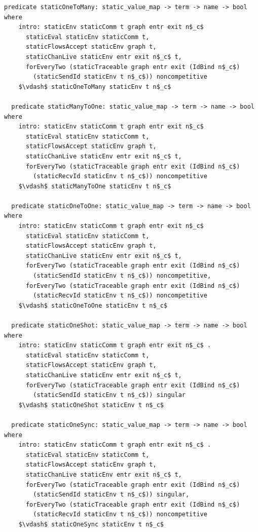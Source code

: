\documentclass[letterpaper, 11pt]{extarticle}
\begin{document}
\begin{lstlisting}[language=logic, mathescape]
  predicate staticOneToMany: static_value_map -> term -> name -> bool where
    intro: staticEnv staticComm t graph entr exit n$_c$ 
      staticEval staticEnv staticComm t,
      staticFlowsAccept staticEnv graph t,
      staticChanLive staticEnv entr exit n$_c$ t, 
      forEveryTwo (staticTraceable graph entr exit (IdBind n$_c$)
        (staticSendId staticEnv t n$_c$)) noncompetitive
    $\vdash$ staticOneToMany staticEnv t n$_c$

  predicate staticManyToOne: static_value_map -> term -> name -> bool where
    intro: staticEnv staticComm t graph entr exit n$_c$ 
      staticEval staticEnv staticComm t,
      staticFlowsAccept staticEnv graph t,
      staticChanLive staticEnv entr exit n$_c$ t, 
      forEveryTwo (staticTraceable graph entr exit (IdBind n$_c$)
        (staticRecvId staticEnv t n$_c$)) noncompetitive
    $\vdash$ staticManyToOne staticEnv t n$_c$

  predicate staticOneToOne: static_value_map -> term -> name -> bool where
    intro: staticEnv staticComm t graph entr exit n$_c$ 
      staticEval staticEnv staticComm t,
      staticFlowsAccept staticEnv graph t,
      staticChanLive staticEnv entr exit n$_c$ t, 
      forEveryTwo (staticTraceable graph entr exit (IdBind n$_c$) 
        (staticSendId staticEnv t n$_c$)) noncompetitive, 
      forEveryTwo (staticTraceable graph entr exit (IdBind n$_c$)
        (staticRecvId staticEnv t n$_c$)) noncompetitive
    $\vdash$ staticOneToOne staticEnv t n$_c$

  predicate staticOneShot: static_value_map -> term -> name -> bool where
    intro: staticEnv staticComm t graph entr exit n$_c$ . 
      staticEval staticEnv staticComm t,
      staticFlowsAccept staticEnv graph t,
      staticChanLive staticEnv entr exit n$_c$ t, 
      forEveryTwo (staticTraceable graph entr exit (IdBind n$_c$)
        (staticSendId staticEnv t n$_c$)) singular
    $\vdash$ staticOneShot staticEnv t n$_c$

  predicate staticOneSync: static_value_map -> term -> name -> bool where
    intro: staticEnv staticComm t graph entr exit n$_c$ . 
      staticEval staticEnv staticComm t,
      staticFlowsAccept staticEnv graph t,
      staticChanLive staticEnv entr exit n$_c$ t, 
      forEveryTwo (staticTraceable graph entr exit (IdBind n$_c$)
        (staticSendId staticEnv t n$_c$)) singular,
      forEveryTwo (staticTraceable graph entr exit (IdBind n$_c$)
        (staticRecvId staticEnv t n$_c$)) noncompetitive 
    $\vdash$ staticOneSync staticEnv t n$_c$
  \end{lstlisting}
\end{document}
